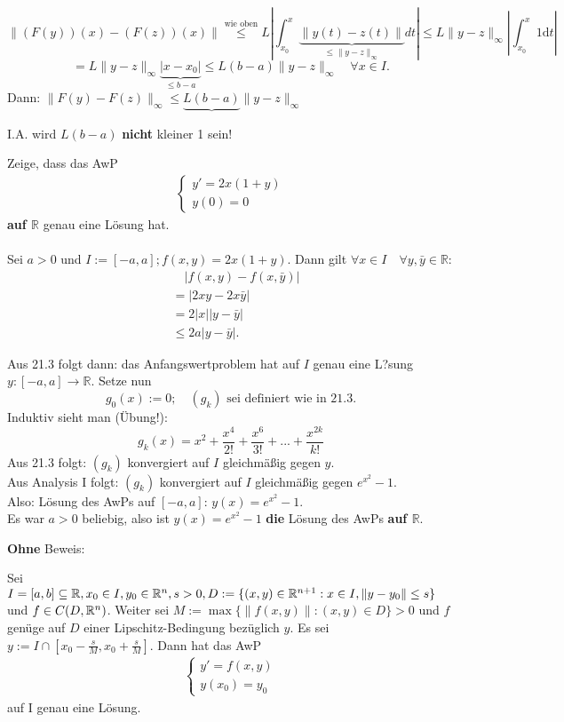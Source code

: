 \documentclass[a4paper,twoside,DIV15,BCOR12mm,chapterprefix=true,headings=twolinechapter]{scrbook}
\begin{document}
\[\|(F(y))(x) -(F(z))(x)\| \stackrel{\text{wie oben}}\leq L \left| \int_{x_0}^x \underbrace{\|y(t)-z(t)\|}_{\leq \|y-z\|_\infty} dt \right| \leq L \|y-z\|_\infty \left| \int_{x_0}^x 1 \text{d}t \right|\]
\[= L \|y-z\|_\infty \underbrace{|x-x_0|}_{\leq b-a} \leq L(b-a) \|y-z\|_\infty \quad \forall x \in I.\]
Dann:  $\|F(y)-F(z)\|_\infty \leq \underbrace{L(b-a)} \|y-z\|_\infty$

I.A. wird $L(b-a)$ \textbf{nicht} kleiner 1 sein!



\begin{beispiel}[zu 21.3]
Zeige, dass das AwP
\begin{align*} \begin{cases}
y' = 2x(1+y)\\
y(0) =  0
\end{cases} \end{align*}
\textbf{auf $\mathbb{R}$} genau eine Lösung hat.
\\
\\
Sei $a > 0$ und $I := [-a, a]; f(x,y) = 2x(1+y).$ Dann gilt $\forall x \in I \quad \forall y, \bar y \in \mathbb{R}:$
\begin{align*}
 &\quad |f(x,y)-f(x, \bar y )|\\
&= |2xy-2x\bar y | \\
&= 2|x||y-\bar y | \\
&\leq 2a|y-\bar y |.
\end{align*}

Aus 21.3 folgt dann: das Anfangswertproblem hat auf $I$ genau eine L?sung $y: [-a, a] \to \mathbb{R}$. Setze nun
\[ g_0(x) :=0 ;\quad (g_k) \text{ sei definiert wie in 21.3.} \]
Induktiv sieht man (Übung!):
\[g_k(x) = x^2 + \frac{x^4}{2!} + \frac{x^6}{3!} + ... + \frac{x^{2k}}{k!} \]
Aus 21.3 folgt: $(g_k)$ konvergiert auf $I$ gleichmäßig gegen $y$.\\
Aus Analysis I folgt: $(g_k)$ konvergiert auf $I$ gleichmäßig gegen $e^{x^2} - 1$.\\
Also: Lösung des AwPs auf $[-a,a]$: $y(x) = e^{x^2} -1$.\\
Es war $a > 0$ beliebig, also ist $y(x) = e^{x^2} -1$ \textbf{die} Lösung des AwPs \textbf{auf $\mathbb{R}$}.
\end{beispiel}

\textbf{Ohne} Beweis:
\begin{satz}
Sei $I=[a,b] \subseteq \mathbb{R}, x_0 \in I, y_0 \in \mathbb{R}^n, s > 0, D := \{(x,y)\in\mathbb{R}^{n+1} : x \in I, \|y-y_0\| \leq s\}$ und $f \in C(D,\mathbb{R}^n)$. Weiter sei $M := \max\{\|f(x,y)\| : (x,y) \in D \} > 0$ und $f$ genüge auf $D$ einer Lipschitz-Bedingung bezüglich $y$. Es sei $y := I \cap [x_0 - \frac{s}{M}, x_0 + \frac{s}{M}]$. Dann hat das AwP
\begin{align*} \begin{cases}
y' = f(x,y)\\
y(x_0) = y_0
\end{cases}
\label{(ii)}
\end{align*}
auf I genau eine Lösung.
\end{satz}
\end{document}
